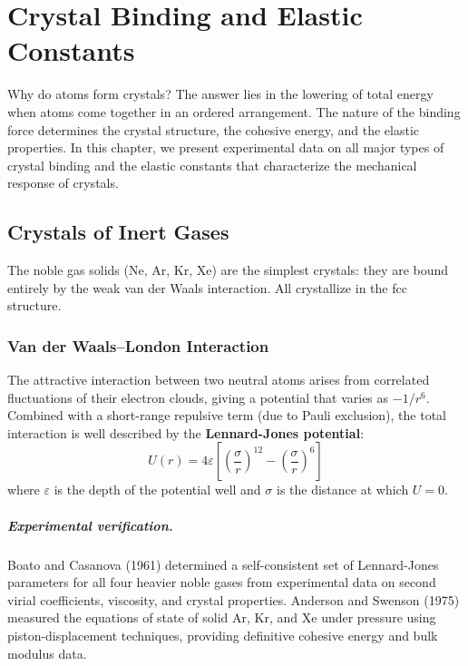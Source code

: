 \chapter{Crystal Binding and Elastic Constants}

Why do atoms form crystals? The answer lies in the lowering of total energy when atoms come together in an ordered arrangement. The nature of the binding force determines the crystal structure, the cohesive energy, and the elastic properties. In this chapter, we present experimental data on all major types of crystal binding and the elastic constants that characterize the mechanical response of crystals.

\section{Crystals of Inert Gases}

The noble gas solids (Ne, Ar, Kr, Xe) are the simplest crystals: they are bound entirely by the weak van der Waals interaction. All crystallize in the fcc structure.

\subsection{Van der Waals--London Interaction}

The attractive interaction between two neutral atoms arises from correlated fluctuations of their electron clouds, giving a potential that varies as $-1/r^6$. Combined with a short-range repulsive term (due to Pauli exclusion), the total interaction is well described by the \textbf{Lennard-Jones potential}:
\begin{equation}
  U(r) = 4\varepsilon\left[\left(\frac{\sigma}{r}\right)^{12} - \left(\frac{\sigma}{r}\right)^{6}\right]
\end{equation}
where $\varepsilon$ is the depth of the potential well and $\sigma$ is the distance at which $U = 0$.

\paragraph{Experimental verification.} Boato and Casanova (1961) determined a self-consistent set of Lennard-Jones parameters for all four heavier noble gases from experimental data on second virial coefficients, viscosity, and crystal properties. Anderson and Swenson (1975) measured the equations of state of solid Ar, Kr, and Xe under pressure using piston-displacement techniques, providing definitive cohesive energy and bulk modulus data.

